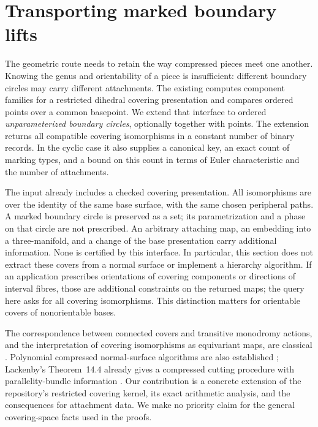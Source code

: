 \section{Transporting marked boundary lifts}\label{sec:transport}

The geometric route needs to retain the way compressed pieces meet one
another.  Knowing the genus and orientability of a piece is insufficient:
different boundary circles may carry different attachments.  The existing
 computes component families for a restricted
dihedral covering presentation and compares ordered points over a common
basepoint.  We extend that interface to ordered \emph{unparameterized
boundary circles}, optionally together with points.  The extension returns
all compatible covering isomorphisms in a constant number of binary
records.  In the cyclic case it also supplies a canonical key, an exact
count of marking types, and a bound on this count in terms of Euler
characteristic and the number of attachments.

 The input already includes a checked covering presentation.
All isomorphisms are over the identity of the same base surface, with the
same chosen peripheral paths.  A marked boundary circle is preserved as
a set; its parametrization and a phase on that circle are not prescribed.
An arbitrary attaching map, an embedding into a three-manifold, and a
change of the base presentation carry additional information.  None is
certified by this interface.  In particular, this section does not extract
these covers from a normal surface or implement a hierarchy algorithm.
If an application prescribes orientations of covering components or
directions of interval fibres, those are additional constraints on the
returned maps; the query here asks for all covering isomorphisms.  This
distinction matters for orientable covers of nonorientable bases.

The correspondence between connected covers and transitive monodromy
actions, and the interpretation of covering isomorphisms as equivariant
maps, are classical \cite[Section 1.3]{hatcher-covering}.  Polynomial
compressed normal-surface algorithms are also established
\cite{aht-orbits}; Lackenby's Theorem~14.4 already gives a compressed
cutting procedure with parallelity-bundle information
\cite{lackenby2026}.  Our contribution is a concrete extension of the
repository's restricted covering kernel, its exact arithmetic analysis,
and the consequences for attachment data.  We make no priority claim for
the general covering-space facts used in the proofs.

